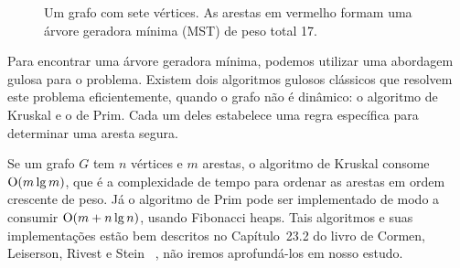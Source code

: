 \begin{figure}
    \centering
    \caption{Um grafo com sete vértices. As arestas em vermelho formam uma árvore geradora mínima (MST) de peso total 17.}
    \label{fig:mst_example}
\end{figure}

Para encontrar uma árvore geradora mínima, podemos utilizar uma abordagem gulosa para o problema. Existem dois algoritmos gulosos clássicos que resolvem este problema eficientemente, quando o grafo não é dinâmico: o algoritmo de Kruskal e o de Prim. Cada um deles estabelece uma regra específica para determinar uma aresta segura.

Se um grafo $G$ tem $n$ vértices e $m$ arestas, o algoritmo de Kruskal consome $\mathrm{O}(m \lg m)$, que é a complexidade de tempo para ordenar as arestas em ordem crescente de peso. Já o algoritmo de Prim pode ser implementado de modo a consumir $\mathrm{O}(m + n \lg n)$, usando Fibonacci heaps. Tais algoritmos e suas implementações estão bem descritos no Capítulo~23.2 do livro de Cormen, Leiserson, Rivest e Stein ~\cite{clrs}, não iremos aprofundá-los em nosso estudo. 

